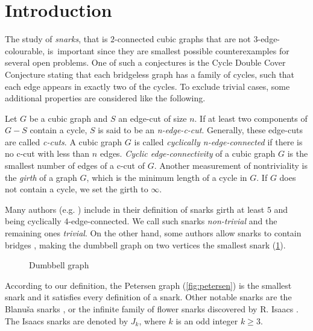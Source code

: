 \section{Introduction}


The study of \textit{snarks}, that is $2$-connected cubic graphs that are not 3-edge-colourable, is~important since they are smallest possible counterexamples for several open problems.
One of such a conjectures is the Cycle Double Cover Conjecture stating that each bridgeless graph has a family of cycles, such that each edge appears in exactly two of the cycles.
To exclude trivial cases, some additional properties are considered like the following.

Let $G$ be a cubic graph and $S$ an edge-cut of size $n$. If at least two components of $G - S$ contain a cycle, $S$ is said to be an \textit{n-edge-c-cut}. Generally, these edge-cuts are called \textit{c-cuts}. 
A cubic graph $G$ is called \textit{cyclically n-edge-connected} if there is no c-cut with less than $n$ edges. \textit{Cyclic edge-connectivity} of a cubic graph $G$ is the smallest number of edges of a c-cut of $G$.
Another measurement of nontriviality is the \textit{girth} of a graph $G$, which is the minimum length of a cycle in $G$. If $G$ does not contain a cycle, we set the girth to $\infty$.

Many authors (e.g. \cite{Preissmann1983, Nedela1996}) include in their definition of snarks girth at least $5$ and being cyclically 4-edge-connected. We call such snarks \emph{non-trivial} and the remaining ones \emph{trivial}. On the other hand, some authors allow snarks to contain bridges \cite{IrreducibleSnarksSkoviera}, making the dumbbell graph on two vertices the smallest snark (\cref{fig:dumbbell}).

\begin{figure}
	\centering
	
	\caption{Dumbbell graph}
	\label{fig:dumbbell}
\end{figure}

According to our definition, the Petersen graph (\cref{fig:petersen}) is the smallest snark and it satisfies every definition of a snark. Other notable snarks are the Blanuša snarks \cite{Blanusa}, or the infinite family of flower snarks discovered by R. Isaacs \cite{Isaacs1975}. The Isaacs snarks are denoted by $J_k$, where $k$ is an odd integer $k\geq 3$.

